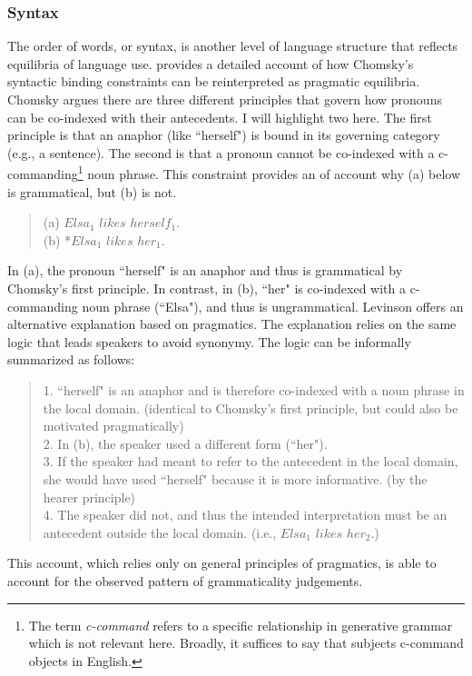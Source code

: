 \documentclass[man, noapacite, 12pt]{apa2}
\begin{document}
\subsubsection{Syntax}
The order of words, or syntax, is another level of language structure that reflects equilibria of language use.  provides a detailed account of how Chomsky's syntactic binding constraints can be reinterpreted as pragmatic equilibria. Chomsky argues there are three different principles that govern how pronouns can be co-indexed with their antecedents. I will highlight two here. The first principle is that an anaphor (like ``herself") is bound in its governing category (e.g., a sentence). The second is that a pronoun cannot be co-indexed with a c-commanding\footnote{The term {\it c-command} refers to a specific relationship in generative grammar which is not relevant here. Broadly, it suffices to say that subjects c-command objects in English.} noun phrase.  This constraint provides an of account why (a) below is grammatical, but (b) is not.
 \begin{quote} 
 	(a) $Elsa_1$ $likes$ $herself_1.$\\
 	(b) *$Elsa_1$ $likes$ $her_1.$
\end{quote}
In (a), the pronoun ``herself" is an anaphor and thus is grammatical by Chomsky's first principle. In contrast, in (b), ``her" is co-indexed with a c-commanding noun phrase (``Elsa"), and thus is ungrammatical. Levinson offers an alternative explanation based on pragmatics. The explanation relies on the same logic that leads speakers to avoid synonymy. The logic can be informally summarized as follows:
 \begin{quote} 
 	1. ``herself" is an anaphor and is therefore co-indexed with a noun phrase in the local domain. (identical to Chomsky's first principle, but could also be motivated pragmatically)\\
	2. In (b), the speaker used a different form (``her").\\
	3. If the speaker had meant to refer to the antecedent in the local domain, she would have used ``herself" because it is more informative. (by the hearer principle)\\
	4. The speaker did not, and thus the intended interpretation must be an antecedent outside the local domain.  (i.e., $Elsa_1$ $likes$ $her_2.$)
\end{quote}
This account, which relies only on general principles of pragmatics, is able to account for the observed pattern of grammaticality judgements.
	
\end{document}
